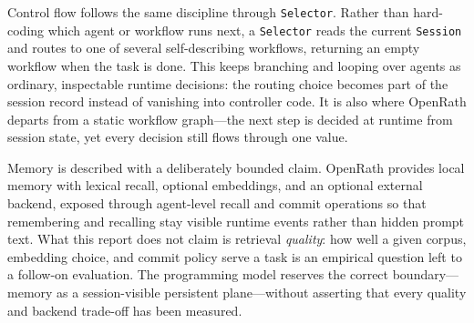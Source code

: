 Control flow follows the same discipline through \texttt{Selector}. Rather than
hard-coding which agent or workflow runs next, a \texttt{Selector} reads the
current \texttt{Session} and routes to one of several self-describing
workflows, returning an empty workflow when the task is done. This keeps
branching and looping over agents as ordinary, inspectable runtime decisions:
the routing choice becomes part of the session record instead of vanishing into
controller code. It is also where OpenRath departs from a static workflow
graph---the next step is decided at runtime from session state, yet every
decision still flows through one value.

Memory is described with a deliberately bounded claim. OpenRath provides local
memory with lexical recall, optional embeddings, and an optional external
backend, exposed through agent-level recall and commit operations so that
remembering and recalling stay visible runtime events rather than hidden prompt
text. What this report does not claim is retrieval \emph{quality}: how well a
given corpus, embedding choice, and commit policy serve a task is an empirical
question left to a follow-on evaluation. The programming model reserves the
correct boundary---memory as a session-visible persistent plane---without
asserting that every quality and backend trade-off has been measured.
